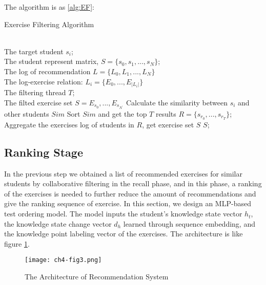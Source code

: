 The algorithm is as \ref{alg:EF}:
\begin{algorithm}[h]
  \caption{Exercise Filtering Algorithm}
  \label{alg:EF}
  \begin{algorithmic}
  \REQUIRE ~~\\ 
  The target student $s_i$; \\
  The student represent matrix, $S=\{s_0,s_1,...,s_N\}$;\\
  The log of recommendation $L=\{L_0,L_1,...,L_N\}$ \\
  The log-exercise relation: $L_i=\{E_0,...,E_{|L_i|}\}$\\
  The filtering thread $T$;
  \ENSURE ~~\\ %
  The filted exercise set $S={E_{s_0},...,E_{s_{N^'}}}$
  \STATE Calculate the similarity between $s_i$ and other students $Sim$
  \STATE Sort $Sim$ and get the top $T$ results $R=\{s_{r_0},...,s_{r_T}\}$; 
  \STATE Aggregate the exercises log of students in $R$, get exercise set $S$
  \RETURN $S$; %
  \end{algorithmic}
\end{algorithm}




\subsection{Ranking Stage}

In the previous step we obtained a list of recommended exercises for similar students by collaborative filtering in the recall phase, and in this phase, a ranking of the exercises is needed to further reduce the amount of recommendations and give the ranking sequence of exercise. In this section, we design an MLP-based test ordering model. The model inputs the student's knowledge state vector $h_t$, the knowledge state change vector $d_h$ learned through sequence embedding, and the knowledge point labeling vector of the exercises. The architecture is like figure \ref{fig:ch4-fig3}.


\begin{figure}[h]
	\centering
	\texttt{[image: ch4-fig3.png]}
	\caption{The Architecture of Recommendation System}
	\label{fig:ch4-fig3}
\end{figure}

